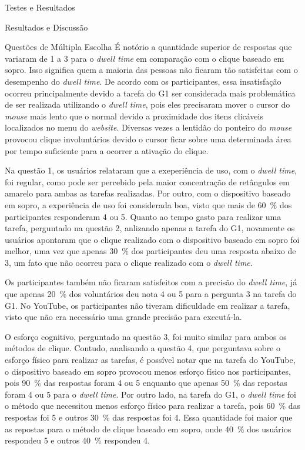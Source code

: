 \begin{chapter}{Testes e Resultados}
\begin{section}{Resultados e Discussão}
\begin{subsection}{Questões de Múltipla Escolha}
É notório a quantidade superior de respostas que variaram de 1 a 3 para o
\textit{dwell time} em comparação com o clique baseado em sopro. Isso significa
quem a maioria das pessoas não ficaram tão satisfeitas com o desempenho do
\textit{dwell time}. De acordo com os participantes, essa insatisfação ocorreu
principalmente devido a tarefa do G1 ser considerada mais problemática de ser
realizada utilizando o \textit{dwell time}, pois eles precisaram mover o
cursor do \textit{mouse} mais lento que o normal devido a proximidade dos itens
clicáveis localizados no menu do \textit{website}. Diversas vezes a lentidão do
ponteiro do \textit{mouse} provocou clique involuntários devido o cursor ficar
sobre uma determinada área por tempo suficiente para a ocorrer a ativação do
clique.

Na questão 1, os usuários relataram que a exeperiência de uso, com o
\textit{dwell time}, foi regular, como pode ser percebido pela maior
concentração de retângulos em amarelo para ambas as tarefas realizadas. Por
outro, com o dispositivo baseado em sopro, a experiência de uso foi considerada
boa, visto que mais de 60~\% dos participantes responderam 4 ou 5.  Quanto ao
tempo gasto para realizar uma tarefa, perguntado na questão 2, anlizando apenas
a tarefa do G1, novamente os usuários apontaram que o clique realizado com o
dispositivo baseado em sopro foi melhor, uma vez que apenas 30~\% dos
participantes deu uma resposta abaixo de 3, um fato que não ocorreu para o
clique realizado com o \textit{dwell time}.

Os participantes também não ficaram satisfeitos com a precisão do \textit{dwell
time}, já que apenas 20~\% dos voluntários deu nota 4 ou 5 para a pergunta 3 na
tarefa do G1. No YouTube, os participantes não tiveram dificuldade em realizar a
tarefa, visto que não era necessário uma grande precisão para executá-la. 

O esforço cognitivo, perguntado na questão 3, foi muito similar para ambos os
métodos de clique. Contudo, analisando a questão 4, que perguntava sobre o
esforço físico para realizar as tarefas, é possível notar que na tarefa do
YouTube, o dispositivo baseado em sopro provocou menos esforço físico nos
participantes, pois 90~\% das respostas foram 4 ou 5 enquanto que apenas 50~\%
das repostas foram 4 ou 5 para o \textit{dwell time}. Por outro lado, na tarefa
do G1, o \textit{dwell time} foi o método que necessitou menos esforço físico
para realizar a tarefa, pois 60~\% das respostas foi 5 e outros 30~\% das
respostas foi 4. Essa quantidade foi maior que as repostas para o método de
clique baseado em sopro, onde 40~\% dos usuários respondeu 5 e outros 40~\%
respondeu 4.


\end{subsection}
\end{section}
\end{chapter}
